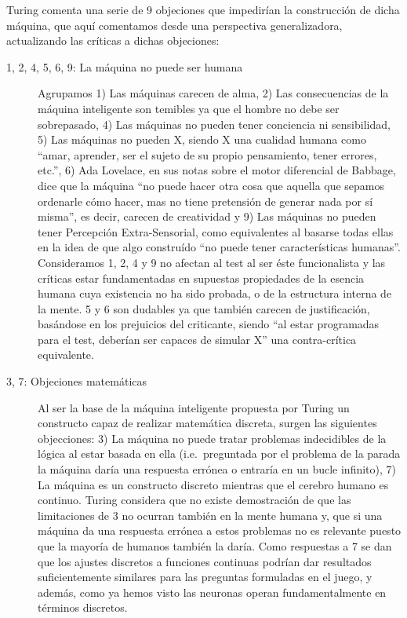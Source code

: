 \documentclass[12pt]{memoir}
\begin{document}
Turing comenta una serie de 9 objeciones que impedirían la construcción de dicha máquina, que aquí comentamos desde una perspectiva generalizadora, actualizando las críticas a dichas objeciones:

\begin{description}
	\item[1, 2, 4, 5, 6, 9: La máquina no puede ser humana] Agrupamos 1) Las máquinas carecen de alma, 2) Las consecuencias de la máquina inteligente son temibles ya que el hombre no debe ser sobrepasado, 4) Las máquinas no pueden tener conciencia ni sensibilidad, 5) Las máquinas no pueden X, siendo X una cualidad humana como ``amar, aprender, ser el sujeto de su propio pensamiento, tener errores, etc.'', 6) Ada Lovelace, en sus notas sobre el motor diferencial de Babbage, dice que la máquina ``no puede hacer otra cosa que aquella que sepamos ordenarle cómo hacer, mas no tiene pretensión de generar nada por sí misma'', es decir, carecen de creatividad y 9) Las máquinas no pueden tener Percepción Extra-Sensorial, como equivalentes al basarse todas ellas en la idea de que algo construído ``no puede tener características humanas''. Consideramos 1, 2, 4 y 9 no afectan al test al ser éste funcionalista y las críticas estar fundamentadas en supuestas propiedades de la esencia humana cuya existencia no ha sido probada, o de la estructura interna de la mente. 5 y 6 son dudables ya que también carecen de justificación, basándose en los prejuicios del criticante, siendo ``al estar programadas para el test, deberían ser capaces de simular X'' una contra-crítica equivalente.
	\item[3, 7: Objeciones matemáticas] Al ser la base de la máquina inteligente propuesta por Turing un constructo capaz de realizar matemática discreta, surgen las siguientes objecciones: 3) La máquina no puede tratar problemas indecidibles de la lógica al estar basada en ella (i.e.\ preguntada por el problema de la parada la máquina daría una respuesta errónea o entraría en un bucle infinito), 7) La máquina es un constructo discreto mientras que el cerebro humano es continuo. Turing considera que no existe demostración de que las limitaciones de 3 no ocurran también en la mente humana y, que si una máquina da una respuesta errónea a estos problemas no es relevante puesto que la mayoría de humanos también la daría. Como respuestas a 7 se dan que los ajustes discretos a funciones continuas podrían dar resultados suficientemente similares para las preguntas formuladas en el juego, y además, como ya hemos visto las neuronas operan fundamentalmente en términos discretos.

\end{description}
\end{document}
